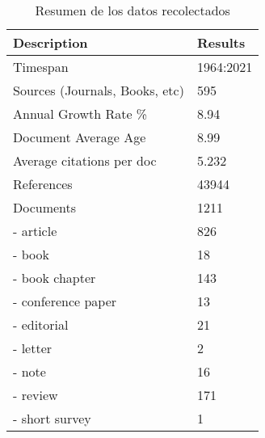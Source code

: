 \begin{table}[htbp]
	\centering
	\begin{tabular}{|l|l|}
		\hline
		\textbf{Description} & \textbf{Results} \\ \hline
		Timespan & 1964:2021 \\ \hline
		Sources (Journals, Books, etc) & 595 \\ \hline
		Annual Growth Rate \% & 8.94 \\ \hline
		Document Average Age & 8.99 \\ \hline
		Average citations per doc & 5.232 \\ \hline
		References & 43944 \\ \hline
		Documents & 1211 \\ \hline
		- article & 826 \\ \hline
		- book & 18 \\ \hline
		- book chapter & 143 \\ \hline
		- conference paper & 13 \\ \hline
		- editorial & 21 \\ \hline
		- letter & 2 \\ \hline
		- note & 16 \\ \hline
		- review & 171 \\ \hline
		- short survey & 1 \\ \hline
	\end{tabular}
	\caption{Resumen de los datos recolectados}
	\label{tb:resumen}
\end{table}

